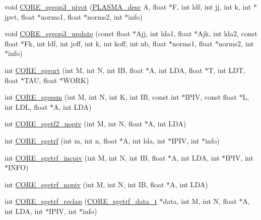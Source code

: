 \begin{DoxyCompactItemize}
void \hyperlink{group__CORE__float_gab08d5db6e81f064672509dfab329d709_gab08d5db6e81f064672509dfab329d709}{C\+O\+R\+E\+\_\+sgeqp3\+\_\+pivot} (\hyperlink{structplasma__desc__t}{P\+L\+A\+S\+M\+A\+\_\+desc} A, float $\ast$F, int ldf, int jj, int k, int $\ast$jpvt, float $\ast$norms1, float $\ast$norms2, int $\ast$info)
\item 
void \hyperlink{group__CORE__float_ga77a89ae2b4e1474c9120bfdcebf74e98_ga77a89ae2b4e1474c9120bfdcebf74e98}{C\+O\+R\+E\+\_\+sgeqp3\+\_\+update} (const float $\ast$Ajj, int lda1, float $\ast$Ajk, int lda2, const float $\ast$Fk, int ldf, int joff, int k, int koff, int nb, float $\ast$norms1, float $\ast$norms2, int $\ast$info)
\item 
int \hyperlink{group__CORE__float_gaaea86dc442e10462ce336981e899003c_gaaea86dc442e10462ce336981e899003c}{C\+O\+R\+E\+\_\+sgeqrt} (int M, int N, int I\+B, float $\ast$A, int L\+D\+A, float $\ast$T, int L\+D\+T, float $\ast$T\+A\+U, float $\ast$W\+O\+R\+K)
\item 
int \hyperlink{group__CORE__float_gacc27c3f817cadbe7b8c5e98986b5c1be_gacc27c3f817cadbe7b8c5e98986b5c1be}{C\+O\+R\+E\+\_\+sgessm} (int M, int N, int K, int I\+B, const int $\ast$I\+P\+I\+V, const float $\ast$L, int L\+D\+L, float $\ast$A, int L\+D\+A)
\item 
int \hyperlink{group__CORE__float_gaa33cc6a6ed38d3091f7d3fae99c29e1c_gaa33cc6a6ed38d3091f7d3fae99c29e1c}{C\+O\+R\+E\+\_\+sgetf2\+\_\+nopiv} (int M, int N, float $\ast$A, int L\+D\+A)
\item 
int \hyperlink{group__CORE__float_gac24edae9901cfd85cddaee3db916d78a_gac24edae9901cfd85cddaee3db916d78a}{C\+O\+R\+E\+\_\+sgetrf} (int m, int n, float $\ast$A, int lda, int $\ast$I\+P\+I\+V, int $\ast$info)
\item 
int \hyperlink{group__CORE__float_gaad34e567d33cbaba5d2a73b490f3ba38_gaad34e567d33cbaba5d2a73b490f3ba38}{C\+O\+R\+E\+\_\+sgetrf\+\_\+incpiv} (int M, int N, int I\+B, float $\ast$A, int L\+D\+A, int $\ast$I\+P\+I\+V, int $\ast$I\+N\+F\+O)
\item 
int \hyperlink{group__CORE__float_gac6ed6c353048821917c0350959bb2d03_gac6ed6c353048821917c0350959bb2d03}{C\+O\+R\+E\+\_\+sgetrf\+\_\+nopiv} (int M, int N, int I\+B, float $\ast$A, int L\+D\+A)
\item 
int \hyperlink{group__CORE__float_ga06ec700bbc4d2d02268312cbe9f87329_ga06ec700bbc4d2d02268312cbe9f87329}{C\+O\+R\+E\+\_\+sgetrf\+\_\+reclap} (\hyperlink{structCORE__sgetrf__data__s}{C\+O\+R\+E\+\_\+sgetrf\+\_\+data\+\_\+t} $\ast$data, int M, int N, float $\ast$A, int L\+D\+A, int $\ast$I\+P\+I\+V, int $\ast$info)

\end{DoxyCompactItemize}
